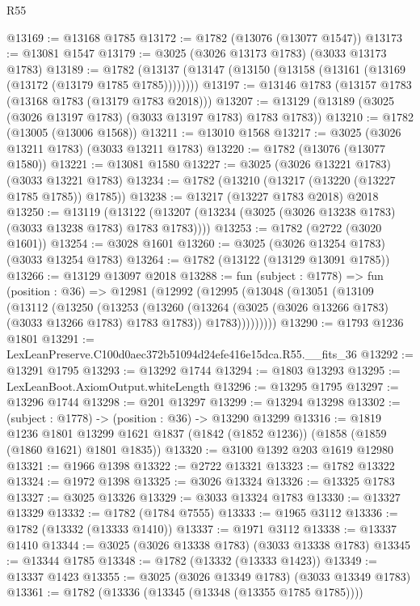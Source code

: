 \begin{lexlean}{R55}
\begin{coremodule}
@13169 := @13168 @1785
@13172 := @1782 (@13076 (@13077 @1547))
@13173 := @13081 @1547
@13179 := @3025 (@3026 @13173 @1783) (@3033 @13173 @1783)
@13189 := @1782 (@13137 (@13147 (@13150 (@13158 (@13161 (@13169 (@13172 (@13179 @1785 @1785))))))))
@13197 := @13146 @1783 (@13157 @1783 (@13168 @1783 (@13179 @1783 @2018)))
@13207 := @13129 (@13189 (@3025 (@3026 @13197 @1783) (@3033 @13197 @1783) @1783 @1783))
@13210 := @1782 (@13005 (@13006 @1568))
@13211 := @13010 @1568
@13217 := @3025 (@3026 @13211 @1783) (@3033 @13211 @1783)
@13220 := @1782 (@13076 (@13077 @1580))
@13221 := @13081 @1580
@13227 := @3025 (@3026 @13221 @1783) (@3033 @13221 @1783)
@13234 := @1782 (@13210 (@13217 (@13220 (@13227 @1785 @1785)) @1785))
@13238 := @13217 (@13227 @1783 @2018) @2018
@13250 := @13119
    (@13122 (@13207 (@13234 (@3025 (@3026 @13238 @1783) (@3033 @13238 @1783) @1783 @1783))))
@13253 := @1782 (@2722 (@3020 @1601))
@13254 := @3028 @1601
@13260 := @3025 (@3026 @13254 @1783) (@3033 @13254 @1783)
@13264 := @1782 (@13122 (@13129 @13091 @1785))
@13266 := @13129 @13097 @2018
@13288 := fun (subject : @1778) =>
  fun (position : @36) =>
  @12981
    (@12992
      (@12995
        (@13048
          (@13051
            (@13109
              (@13112
                (@13250
                  (@13253
                    (@13260
                      (@13264 (@3025 (@3026 @13266 @1783) (@3033 @13266 @1783) @1783 @1783))
                      @1783)))))))))
@13290 := @1793 @1236 @1801
@13291 := LexLeanPreserve.C100d0aec372b51094d24efe416e15dca.R55.__fits_36
@13292 := @13291 @1795
@13293 := @13292 @1744
@13294 := @1803 @13293
@13295 := LexLeanBoot.AxiomOutput.whiteLength
@13296 := @13295 @1795
@13297 := @13296 @1744
@13298 := @201 @13297
@13299 := @13294 @13298
@13302 := (subject : @1778) -> (position : @36) -> @13290 @13299
@13316 := @1819
    @1236
    @1801
    @13299
    @1621
    @1837
    (@1842 (@1852 @1236))
    (@1858 (@1859 (@1860 @1621) @1801 @1835))
@13320 := @3100 @1392 @203 @1619 @12980
@13321 := @1966 @1398
@13322 := @2722 @13321
@13323 := @1782 @13322
@13324 := @1972 @1398
@13325 := @3026 @13324
@13326 := @13325 @1783
@13327 := @3025 @13326
@13329 := @3033 @13324 @1783
@13330 := @13327 @13329
@13332 := @1782 (@1784 @7555)
@13333 := @1965 @3112
@13336 := @1782 (@13332 (@13333 @1410))
@13337 := @1971 @3112
@13338 := @13337 @1410
@13344 := @3025 (@3026 @13338 @1783) (@3033 @13338 @1783)
@13345 := @13344 @1785
@13348 := @1782 (@13332 (@13333 @1423))
@13349 := @13337 @1423
@13355 := @3025 (@3026 @13349 @1783) (@3033 @13349 @1783)
@13361 := @1782 (@13336 (@13345 (@13348 (@13355 @1785 @1785))))

\end{coremodule}
\end{lexlean}

